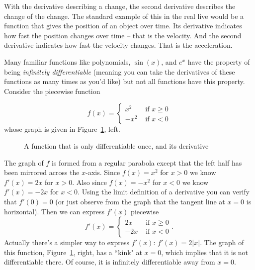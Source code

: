 With the derivative describing a change, the second derivative describes the
change of the change. The standard example of this in the real live would be
a function that gives the position of an object over time. Its derivative
indicates how fast the position changes over time -- that is the velocity.
And the second derivative indicates how fast the velocity changes. That is
the acceleration.

\begin{bsp}

Many familiar functions like polynomials, $\sin(x)$, and $e^x$ have the property
of being \textit{infinitely differentiable} (meaning you can take the
derivatives of these functions as many times as you'd like) but not all
functions have this property. Consider the piecewise function

\[
f(x) = \begin{cases}
x^2 & \text{ if }x \geq 0 \\
-x^2 & \text{ if }x < 0
\end{cases}\]
whose graph is given in Figure~\ref{tnex2figs}, left.

\begin{figure}
\begin{center}
\qquad
\end{center}
\caption{A function that is only differentiable once, and its derivative}
\label{tnex2figs}
\end{figure}

The graph of $f$ is formed from a regular parabola except that the left half
has been mirrored across the $x$-axis. Since $f(x) = x^2$ for $x>0$ we know
$f'(x) = 2x$ for $x>0$. Also since $f(x) = -x^2$ for $x<0$ we know $f'(x) =
-2x$ for $x<0$. Using the limit definition of a derivative you can verify
that $f'(0) = 0$ (or just observe from the graph that the tangent line at
$x=0$ is horizontal). Then we can express $f'(x)$ piecewise
\[f'(x) = \begin{cases}
2x & \text{ if }x \geq 0 \\
-2x & \text{ if }x < 0
\end{cases}.\]
Actually there's a simpler way to express $f'(x)$: $f'(x) = 2|x|$. The graph
of this function, Figure~\ref{tnex2figs}, right,
has a ``kink" at $x=0$, which implies that it is not differentiable there.
Of course, it is infinitely differentiable away from $x=0$.
\end{bsp}

